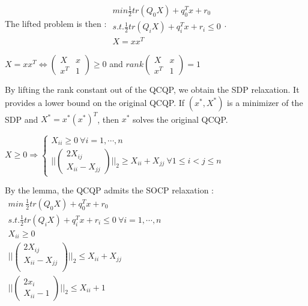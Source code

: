 \documentclass[../main.tex]{subfiles}
\begin{document}
The lifted problem is then : $\begin{matrix}
    min \frac{1}{2} tr(Q_0 X) + q_0^T x +r_0\\
    s.t. \frac{1}{2} tr(Q_iX) + q_i^T x + r_i \leq 0\\
    X = xx^T
\end{matrix}$.\\

\begin{theorem}
    $X = xx^T \Leftrightarrow \begin{pmatrix}
        X & x\\ x^T & 1
    \end{pmatrix} \geq 0$
    and $rank\begin{pmatrix}
        X & x\\ x^T & 1
    \end{pmatrix} = 1$
\end{theorem}

By lifting the rank constant out of the QCQP, we obtain the SDP relaxation. It provides a lower bound on the original QCQP. If $(x^*, X^*)$ is a minimizer of the SDP and $X^* = x^*(x^*)^T$, then $x^*$ solves the original QCQP.\\

\begin{theorem}
    $X \geq 0 \Rightarrow \begin{cases}
        X_{ii} \geq 0 \: \forall i=1, \cdots, n\\
        \lvert\lvert \begin{pmatrix}
            2 X_{ij}\\
            X_{ii} - X_{jj}
        \end{pmatrix} \rvert\rvert_2 \geq X_{ii} + X_{jj} \: \forall 1 \leq i < j \leq n
    \end{cases}$
\end{theorem}

By the lemma, the QCQP admits the SOCP relaxation : $\begin{matrix}
    min \: \frac{1}{2} tr(Q_0 X) + q_0^Tx + r_0\\
    s.t. \frac{1}{2} tr(Q_iX) + q_i^T x + r_i \leq 0\: \forall i=1,\cdots, n\\
    X_{ii} \geq 0\\
    \lvert\lvert \begin{pmatrix}
        2 X_{ij}\\
        X_{ii} - X_{jj}\\
    \end{pmatrix} \rvert\rvert_2 \leq X_{ii} + X_{jj}\\
    \lvert\lvert \begin{pmatrix}
        2x_i\\
        X_{ii}- 1
    \end{pmatrix} \rvert\rvert_2 \leq X_{ii} + 1
\end{matrix}$
\end{document}
